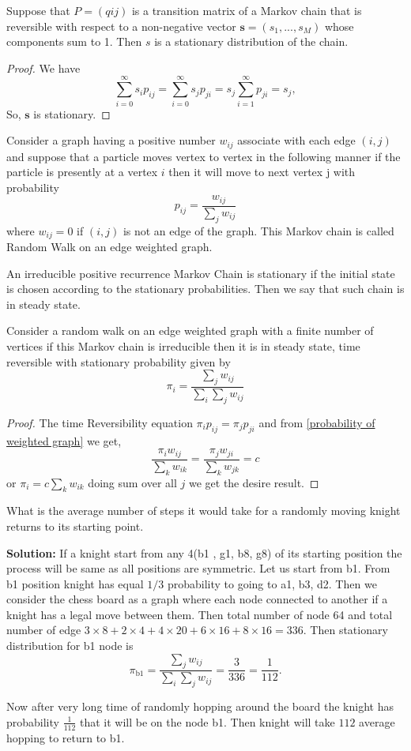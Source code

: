 \begin{proposition}
    Suppose that $P = (qij)$ is
a transition matrix of a Markov chain that is reversible with respect to a non-negative vector 
$\mathbf{s} = (s_1, . . . , s_M)$ whose components sum to 1. Then $s$ is a stationary distribution of the chain.
\end{proposition}
\begin{proof}
    We have 
    \[
        \sum_{i=0}^{\infty} s_{i}p_{ij} = \sum_{i=0}^{\infty} s_{j}p_{ji} = s_{j}\sum_{i=1}^{\infty} p_{ji} = s_{j},
    \]
    So, $ \mathbf{s} $ is stationary.
\end{proof}

Consider a graph having a positive number $ w_{ij} $ associate with each edge $ (i,j) $ and suppose that 
a particle moves vertex to vertex in the following manner if the particle is presently at a vertex  $ i $ then 
it will move to next vertex j with probability 
 \begin{equation}
    \label{probability of weighted graph}
    p_{ij} = \frac{w_{ij}}{\sum_j w_{ij}}
\end{equation}
where $ w_{ij} =0 $ if $ (i,j) $ is not an edge of the graph. This Markov chain is called 
Random Walk on an edge weighted graph.

An irreducible positive recurrence Markov Chain is stationary if the initial state is chosen according to the
stationary probabilities. Then we say that such chain is in steady state.

\begin{proposition}
    Consider a random walk on an edge weighted graph with a finite number of vertices if this Markov chain
    is irreducible then it is in steady state, time reversible with stationary probability given by
    \[
        \pi_{i} = \frac{\sum_{j}w_{ij}}{\sum_{i}\sum_{j}w_{ij}}
    \]
\end{proposition}
\begin{proof}
    The time Reversibility equation 
    $
        \pi_{i}p_{ij} = \pi_{j}p_{ji}
    $
    and from \cref{probability of weighted graph} we get,
    $$ \frac{\pi_{i}w_{ij}}{\sum_{k}w_{ik}} = \frac{\pi_{j}w_{ji}}{\sum_{k}w_{jk}} = c $$
    or $ \pi_{i} = c \sum_{k}w_{ik} $ doing sum over all $ j $ we get the desire result.
\end{proof}

\newpage
\begin{example}
    What is the average number of steps it would take for a randomly moving knight returns to its starting point.
\end{example}
\textbf{Solution: } If a knight start from any 4(b1 , g1, b8, g8) of its starting position the process will be same as all positions are symmetric.
Let us start from b1. From b1 position knight has equal $ 1/3 $ probability to going to  a1, b3, d2. Then we consider the chess board as a graph where 
each node connected to another if a knight has a legal move between them. Then total number of node 64 and total number of edge 
$ 3 \times 8 + 2 \times 4 + 4 \times 20 + 6 \times 16 + 8\times 16 =336 $. Then stationary distribution for b1 node is 
\[
    \pi_{\text{b1}} = \frac{\sum_{j}w_{ij} }{\sum_{i}\sum_{j}w_{ij}} = \frac{3}{336} = \frac{1}{112}.
\]

Now after very long time of randomly hopping around the board the knight has probability $ \frac{1}{112} $ that it will be on the node b1. 
Then knight will take  $ 112 $ average hopping to return to b1.


